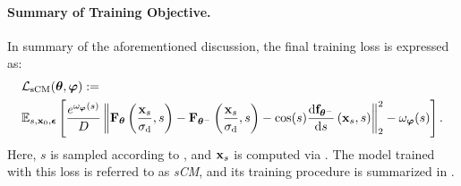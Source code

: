\paragraph{Summary of Training Objective.} In summary of the aforementioned discussion, the final training loss is expressed as:
\begin{align*}
    &\mathcal{L}_{\text{sCM}}(\bm{\theta}, \bm{\varphi})
    := \\&\mathbb{E}_{s, {\mathbf{x}}_0, \bm{\epsilon}} \left[
    \frac{e^{\omega_{\bm{\varphi}}(s)}}{D}
    \left\|
    {\mathbf{F}}_{\bm{\theta}}\left(\frac{{\mathbf{x}}_s}{\sigma_{\mathrm{d}}}, s\right)
    - {\mathbf{F}}_{\bm{\theta}^-}\left(\frac{{\mathbf{x}}_s}{\sigma_{\mathrm{d}}}, s\right)
    - \cos(s) \frac{\mathop{}\!\mathrm{d} {\mathbf{f}}_{\bm{\theta}^-}}{\mathop{}\!\mathrm{d} s}\left({\mathbf{x}}_s, s\right)
    \right\|_2^2
    - \omega_{\bm{\varphi}}(s)
    \right].
\end{align*}
Here, $s$ is sampled according to , and ${\mathbf{x}}_s$ is computed via . The model trained with this loss is referred to as \emph{sCM}, and its training procedure is summarized in .


